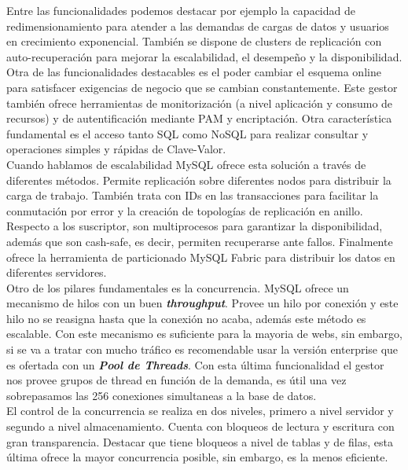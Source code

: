 \documentclass[3pt]{article}
\begin{document}
Entre las funcionalidades podemos destacar por ejemplo la capacidad de redimensionamiento para atender a las demandas de cargas de datos y usuarios en crecimiento exponencial. También se dispone de clusters de replicación con auto-recuperación para mejorar la escalabilidad, el desempeño y la disponibilidad.\\
Otra de las funcionalidades destacables es el poder cambiar el esquema online para satisfacer exigencias de negocio que se cambian constantemente. Este gestor también ofrece herramientas de monitorización (a nivel aplicación y consumo de recursos) y de autentificación mediante PAM y encriptación.
Otra característica fundamental es el acceso tanto SQL como NoSQL para realizar consultar y operaciones simples y rápidas de Clave-Valor.\\

Cuando hablamos de escalabilidad MySQL ofrece esta solución a través de diferentes métodos. Permite replicación sobre diferentes nodos para distribuir la carga de trabajo. También trata con IDs en las transacciones para facilitar la conmutación por error y la creación de topologías de replicación en anillo. Respecto a los suscriptor, son multiprocesos para garantizar la disponibilidad, además que son cash-safe, es decir, permiten recuperarse ante fallos. Finalmente ofrece la herramienta de particionado MySQL Fabric para distribuir los datos en diferentes servidores.\cite{lock}\\

Otro de los pilares fundamentales es la concurrencia. MySQL ofrece un mecanismo de hilos con un buen \textbf{\emph{throughput}}. Provee un hilo por conexión y este hilo no se reasigna hasta que la conexión no acaba, además este método es escalable. Con este mecanismo es suficiente para la mayoria de webs, sin embargo, si se va a tratar con mucho tráfico es recomendable usar la versión enterprise que es ofertada con un \textbf{\emph{Pool de Threads}}. Con esta última funcionalidad el gestor nos provee grupos de thread en función de la demanda, es útil una vez sobrepasamos las 256 conexiones simultaneas a la base de datos.\\
El control de la concurrencia se realiza en dos niveles, primero a nivel servidor y segundo a nivel almacenamiento. Cuenta con bloqueos de lectura y escritura con gran transparencia. Destacar que tiene bloqueos a nivel de tablas y de filas, esta última ofrece la mayor concurrencia posible, sin embargo, es la menos eficiente. \cite{enterprise}\\
\end{document}
